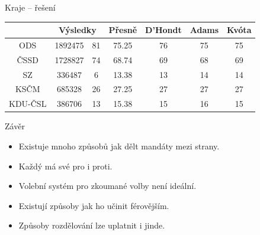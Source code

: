 \documentclass[17pt]{beamer}
\begin{document}
\begin{frame}{Kraje -- řešení}
\footnotesize
\begin{tabular}{|c|c|c|c|c|c|c|} \hline
 & \multicolumn{2}{c|}{Výsledky} & Přesně & D'Hondt & Adams & Kvóta\\
\hline ODS & 1892475 & 81 & 75.25 & 76 & 75 & 75\\
\hline ČSSD & 1728827 & 74 & 68.74 & 69 & 68 & 69\\
\hline SZ & 336487 & 6 & 13.38 & 13 & 14 & 14 \\
\hline KSČM & 685328 & 26 & 27.25 & 27 & 27 & 27 \\
\hline KDU-ČSL & 386706 & 13 & 15.38 & 15 & 16 & 15 \\
\hline
\end{tabular}
\end{frame}

\begin{frame}{Závěr}
\begin{itemize}
\item Existuje mnoho způsobů jak dělt mandáty mezi strany.
\item Každý má své pro i proti.
\item Volební systém pro zkoumané volby není ideální.
\item Existují způsoby jak ho učinit férovějším.
\item Způsoby rozdělování lze uplatnit i jinde.
\end{itemize}
\end{frame}
\end{document}
